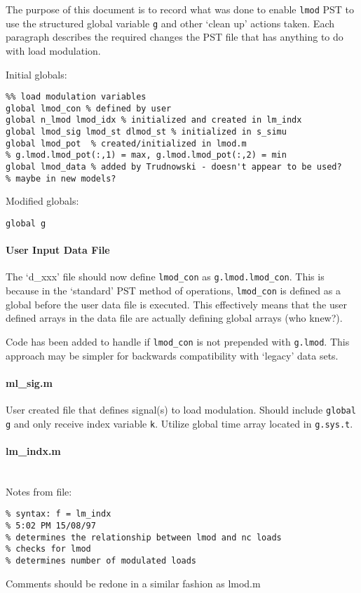 \documentclass[12pt]{article}
\begin{document}
The purpose of this document is to record what was done to enable \verb|lmod| PST to use the structured global variable \verb|g| and other `clean up' actions taken.
Each paragraph describes the required changes the PST file that has anything to do with load modulation.

Initial globals:
\begin{verbatim}
%% load modulation variables
global lmod_con % defined by user
global n_lmod lmod_idx % initialized and created in lm_indx
global lmod_sig lmod_st dlmod_st % initialized in s_simu
global lmod_pot  % created/initialized in lmod.m 
% g.lmod.lmod_pot(:,1) = max, g.lmod.lmod_pot(:,2) = min
global lmod_data % added by Trudnowski - doesn't appear to be used?
% maybe in new models?
\end{verbatim}

Modified globals:
\begin{verbatim}
global g
\end{verbatim}

\paragraph{User Input Data File}
The `d\_xxx' file should now define \verb|lmod_con| as \verb|g.lmod.lmod_con|.
This is because in the `standard' PST method of operations, \verb|lmod_con| is defined as a global before the user data file is executed.
This effectively means that the user defined arrays in the data file are actually defining global arrays (who knew?).

Code has been added to handle if \verb|lmod_con| is not prepended with \verb|g.lmod|.
This approach may be simpler for backwards compatibility with `legacy' data sets.

\paragraph{ml\_sig.m}
User created file that defines signal(s) to load modulation.
Should include \verb|global g| and only receive index variable \verb|k|.
Utilize global time array located in \verb|g.sys.t|.

\paragraph{lm\_indx.m} %
\ \\
Notes from file:
\begin{verbatim}
% syntax: f = lm_indx
% 5:02 PM 15/08/97
% determines the relationship between lmod and nc loads
% checks for lmod
% determines number of modulated loads
\end{verbatim}
Comments should be redone in a similar fashion as lmod.m
\end{document}
